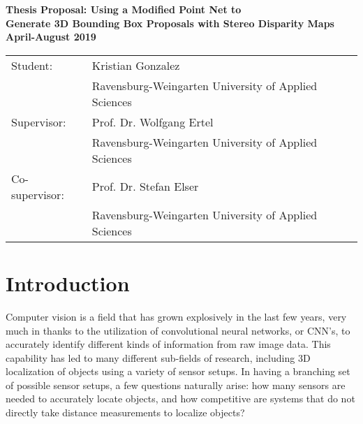 \begin{center}
    \large
    \textbf{Thesis Proposal: Using a Modified Point Net to \\ Generate 3D Bounding Box Proposals with Stereo Disparity Maps}\\
    \noindent \textbf{April-August 2019}\\
    \normalsize 
\end{center}

\begin{tabular}{ll}
    Student: & Kristian Gonzalez \\
    & Ravensburg-Weingarten University of Applied Sciences\\
    Supervisor: & Prof. Dr. Wolfgang Ertel \\
    & Ravensburg-Weingarten University of Applied Sciences\\
    Co-supervisor: & Prof. Dr. Stefan Elser\\
    & Ravensburg-Weingarten University of Applied Sciences\\
\end{tabular}


\section{Introduction} 
Computer vision is a field that has grown explosively in the last few years, very much in thanks to the utilization of convolutional neural networks, or CNN's, to accurately identify different kinds of information from raw image data. This capability has led to many different sub-fields of research, including 3D localization of objects using a variety of sensor setups. In having a branching set of possible sensor setups, a few questions naturally arise: how many sensors are needed to accurately locate objects, and how competitive are systems that do not directly take distance measurements to localize objects? 

